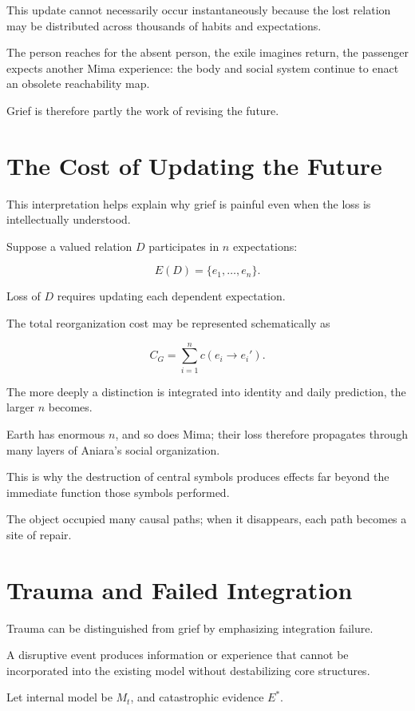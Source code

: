 \documentclass[11pt,oneside]{book}
\theoremstyle{definition}
\theoremstyle{remark}
\begin{document}
This update cannot necessarily occur instantaneously because the lost relation may be distributed across thousands of habits and expectations.

The person reaches for the absent person, the exile imagines return, the passenger expects another Mima experience: the body and social system continue to enact an obsolete reachability map.

Grief is therefore partly the work of revising the future.

\section{The Cost of Updating the Future}

This interpretation helps explain why grief is painful even when the loss is intellectually understood.

Suppose a valued relation \(D\) participates in \(n\) expectations:

\[
E(D)
=
\{e_1,\ldots,e_n\}.
\]

Loss of \(D\) requires updating each dependent expectation.

The total reorganization cost may be represented schematically as

\[
C_G
=
\sum_{i=1}^{n}
c(e_i\rightarrow e_i').
\]

The more deeply a distinction is integrated into identity and daily prediction, the larger \(n\) becomes.

Earth has enormous \(n\), and so does Mima; their loss therefore propagates through many layers of Aniara's social organization.

This is why the destruction of central symbols produces effects far beyond the immediate function those symbols performed.

The object occupied many causal paths; when it disappears, each path becomes a site of repair.

\section{Trauma and Failed Integration}

Trauma can be distinguished from grief by emphasizing integration failure.

A disruptive event produces information or experience that cannot be incorporated into the existing model without destabilizing core structures.

Let internal model be \(M_t\), and catastrophic evidence \(E^\ast\).
\end{document}

